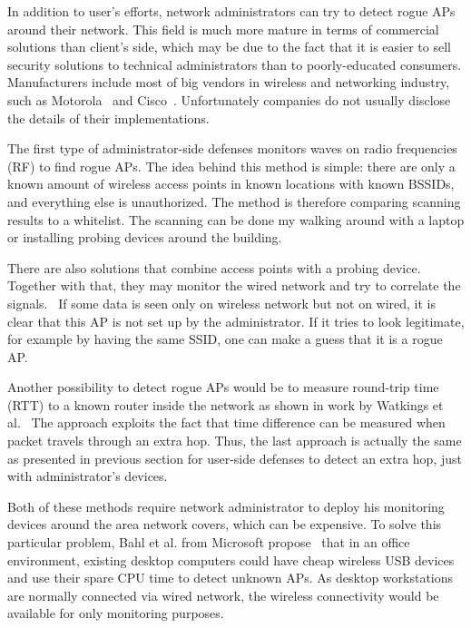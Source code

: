 \documentclass[12pt,a4paper,oneside,pdftex]{report}
\begin{document}
In addition to user's efforts, network administrators can try to detect rogue APs around their network. This field is much more mature in terms of commercial solutions than client's side, which may be due to the fact that it is easier to sell security solutions to technical administrators than to poorly-educated consumers. Manufacturers include most of big vendors in wireless and networking industry, such as Motorola~\cite{motorola_airdefense} and Cisco~\cite{cisco_ips}. Unfortunately companies do not usually disclose the details of their implementations.

The first type of administrator-side defenses monitors waves on radio frequencies (RF) to find rogue APs. The idea behind this method is simple: there are only a known amount of wireless access points in known locations with known BSSIDs, and everything else is unauthorized. The method is therefore comparing scanning results to a whitelist. The scanning can be done my walking around with a laptop or installing probing devices around the building.~\cite{proxim_rogue_ap}

There are also solutions that combine access points with a probing device. Together with that, they may monitor the wired network and try to correlate the signals.~\cite{proxim_rogue_ap} If some data is seen only on wireless network but not on wired, it is clear that this AP is not set up by the administrator. If it tries to look legitimate, for example by having the same SSID, one can make a guess that it is a rogue AP.

Another possibility to detect rogue APs would be to measure round-trip time (RTT) to a known router inside the network as shown in work by Watkings et al.~\cite{watkins2007passive} The approach exploits the fact that time difference can be measured when packet travels through an extra hop. Thus, the last approach is actually the same as presented in previous section for user-side defenses to detect an extra hop, just with administrator's devices.

Both of these methods require network administrator to deploy his monitoring devices around the area network covers, which can be expensive. To solve this particular problem, Bahl et al. from Microsoft propose~\cite{bahl2005dair} that in an office environment, existing desktop computers could have cheap wireless USB devices and use their spare CPU time to detect unknown APs. As desktop workstations are normally connected via wired network, the wireless connectivity would be available for only monitoring purposes.
\end{document}
